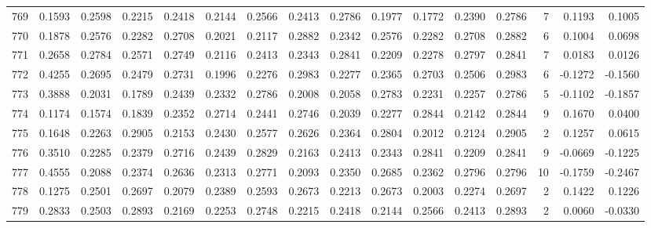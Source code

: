 \begin{tabular}{lrrrrrrrrrrrrrrr}
769 &      0.1593 &  0.2598 &  0.2215 &  0.2418 &  0.2144 &  0.2566 &  0.2413 &  0.2786 &  0.1977 &  0.1772 &   0.2390 &     0.2786 &      7 &                    0.1193 &                     0.1005 \\
770 &      0.1878 &  0.2576 &  0.2282 &  0.2708 &  0.2021 &  0.2117 &  0.2882 &  0.2342 &  0.2576 &  0.2282 &   0.2708 &     0.2882 &      6 &                    0.1004 &                     0.0698 \\
771 &      0.2658 &  0.2784 &  0.2571 &  0.2749 &  0.2116 &  0.2413 &  0.2343 &  0.2841 &  0.2209 &  0.2278 &   0.2797 &     0.2841 &      7 &                    0.0183 &                     0.0126 \\
772 &      0.4255 &  0.2695 &  0.2479 &  0.2731 &  0.1996 &  0.2276 &  0.2983 &  0.2277 &  0.2365 &  0.2703 &   0.2506 &     0.2983 &      6 &                   -0.1272 &                    -0.1560 \\
773 &      0.3888 &  0.2031 &  0.1789 &  0.2439 &  0.2332 &  0.2786 &  0.2008 &  0.2058 &  0.2783 &  0.2231 &   0.2257 &     0.2786 &      5 &                   -0.1102 &                    -0.1857 \\
774 &      0.1174 &  0.1574 &  0.1839 &  0.2352 &  0.2714 &  0.2441 &  0.2746 &  0.2039 &  0.2277 &  0.2844 &   0.2142 &     0.2844 &      9 &                    0.1670 &                     0.0400 \\
775 &      0.1648 &  0.2263 &  0.2905 &  0.2153 &  0.2430 &  0.2577 &  0.2626 &  0.2364 &  0.2804 &  0.2012 &   0.2124 &     0.2905 &      2 &                    0.1257 &                     0.0615 \\
776 &      0.3510 &  0.2285 &  0.2379 &  0.2716 &  0.2439 &  0.2829 &  0.2163 &  0.2413 &  0.2343 &  0.2841 &   0.2209 &     0.2841 &      9 &                   -0.0669 &                    -0.1225 \\
777 &      0.4555 &  0.2088 &  0.2374 &  0.2636 &  0.2313 &  0.2771 &  0.2093 &  0.2350 &  0.2685 &  0.2362 &   0.2796 &     0.2796 &     10 &                   -0.1759 &                    -0.2467 \\
778 &      0.1275 &  0.2501 &  0.2697 &  0.2079 &  0.2389 &  0.2593 &  0.2673 &  0.2213 &  0.2673 &  0.2003 &   0.2274 &     0.2697 &      2 &                    0.1422 &                     0.1226 \\
779 &      0.2833 &  0.2503 &  0.2893 &  0.2169 &  0.2253 &  0.2748 &  0.2215 &  0.2418 &  0.2144 &  0.2566 &   0.2413 &     0.2893 &      2 &                    0.0060 &                    -0.0330 \\

\end{tabular}
